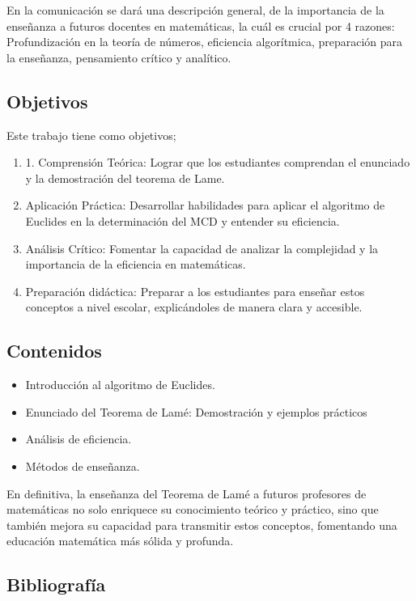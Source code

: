 En la comunicación se dará una descripción general, de la importancia de la enseñanza a futuros docentes en matemáticas, la cuál es crucial por 4 razones: Profundización en la teoría de números, eficiencia algorítmica, preparación para la enseñanza, pensamiento crítico y analítico.

\subsection{Objetivos}

Este trabajo tiene como objetivos;
\begin{enumerate}
	\item 1. Comprensión Teórica: Lograr que los estudiantes comprendan el enunciado y la demostración del teorema de Lame.
	\item Aplicación Práctica: Desarrollar habilidades para aplicar el algoritmo de Euclides en la determinación del MCD y entender su eficiencia.
	\item Análisis Crítico: Fomentar la capacidad de analizar la complejidad y la importancia de la eficiencia en matemáticas.
	\item Preparación didáctica: Preparar a los estudiantes para enseñar estos conceptos a nivel escolar, explicándoles de manera clara y accesible.
\end{enumerate}

\subsection{Contenidos}
\begin{itemize}
	\item Introducción al algoritmo de Euclides.
	\item Enunciado del Teorema de Lamé: Demostración y ejemplos prácticos
	\item Análisis de eficiencia.
	\item Métodos de enseñanza.
\end{itemize}

En definitiva, la enseñanza del Teorema de Lamé a futuros profesores de matemáticas no solo enriquece su conocimiento teórico y práctico, sino que también mejora su capacidad para transmitir estos conceptos, fomentando una educación matemática más sólida y profunda.

\subsection{Bibliografía}

\nocite{*}
\printbibliography[keyword={13}]